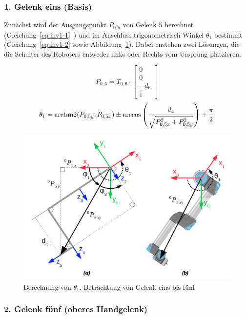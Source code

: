 \subsubsection{1. Gelenk eins (Basis)}

Zunächst wird der Ausgangspunkt $P_{0,5}$ von Gelenk 5 berechnet (Gleichung~\ref{eq:inv1-1}~\cite[4]{rasmusandersenKinematicsUR52018}) und im Anschluss trigonometrisch Winkel $\theta_1$ bestimmt (Gleichung~\ref{eq:inv1-2} sowie Abbildung~\ref{fig:inv1-1}).
Dabei enstehen zwei Lösungen, die die Schulter des Roboters entweder links oder Rechts vom Ursprung platzieren.

\begin{equation}
    P_{0,5} = T_{0,6} \cdot
    \begin{bmatrix}
        0 \\ 0 \\ -d_6 \\ 1
    \end{bmatrix}
    \label{eq:inv1-1}
\end{equation}
\begin{equation}
    \theta_1 = \operatorname{arctan2}(P_{0,5y}, P_{0,5x}) \pm \arccos \left( \frac{d_4}{ \sqrt{ P_{0,5x}^2 + P_{0,5y}^2 }  } \right) + \frac{\pi}{2}
    \label{eq:inv1-2}
\end{equation}
\begin{figure}[h]
    \centering
    \includegraphics[width = .5\textwidth]{Bilder/inv1}
    \caption{Berechnung von $\theta_1$, Betrachtung von Gelenk eins bis fünf~\cite{rasmusandersenKinematicsUR52018}}\label{fig:inv1-1}
\end{figure}

\subsubsection{2. Gelenk fünf (oberes Handgelenk)}

